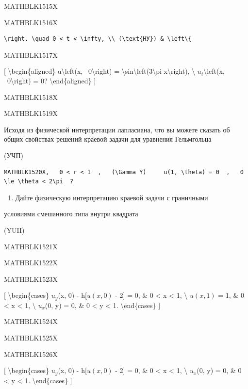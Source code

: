 \documentclass[
]{article}
\providecommand{\tightlist}{%
  \setlength{\itemsep}{0pt}\setlength{\parskip}{0pt}}
\begin{document}
{{{MATHBLK1515X

MATHBLK1516X

\begin{verbatim}
\right. \quad 0 < t < \infty, \\ (\text{НУ}) & \left\{
\end{verbatim}

MATHBLK1517X

{[} \textbackslash begin\{aligned\} u\textbackslash left(x,
~0\textbackslash right) =
\textbackslash sin\textbackslash left(3\textbackslash pi
x\textbackslash right), \textbackslash{} \(u_t\)\textbackslash left(x,
~0\textbackslash right) = 0? \textbackslash end\{aligned\} {]}

MATHBLK1518X

MATHBLK1519X

Исходя из физической интерпретации лапласиана, что вы можете сказать об
общих свойствах решений краевой задачи для уравнения Гельмгольца

(УЧП)

\begin{verbatim}
MATHBLK1520X,   0 < r < 1  ,   (\Gamma Y)     u(1, \theta) = 0  ,   0 \le \theta < 2\pi  ?
\end{verbatim}

\begin{enumerate}
\def\labelenumi{\arabic{enumi}.}
\setcounter{enumi}{5}
\tightlist
\item
  Дайте физическую интерпретацию краевой задачи с граничными
\end{enumerate}

условиями смешанного типа внутри квадрата

(YUII)

MATHBLK1521X

MATHBLK1522X

MATHBLK1523X

{[} \textbackslash begin\{cases\} \(u_y\)(x, 0) - h{[}\(u(x, 0)\) - 2{]}
= 0, \& 0 \textless{} x \textless{} 1, \textbackslash{} \(u(x, 1)\) = 1,
\& 0 \textless{} x \textless{} 1, \textbackslash{} \(u_x\)(0, y) = 0, \&
0 \textless{} y \textless{} 1. \textbackslash end\{cases\} {]}

MATHBLK1524X

MATHBLK1525X

MATHBLK1526X

{[} \textbackslash begin\{cases\} \(u_y\)(x, 0) - h{[}\(u(x, 0)\) - 2{]}
= 0, \& 0 \textless{} x \textless{} 1, \textbackslash{} \(u_x\)(0, y) =
0, \& 0 \textless{} y \textless{} 1. \textbackslash end\{cases\} {]}

}}}
\end{document}
